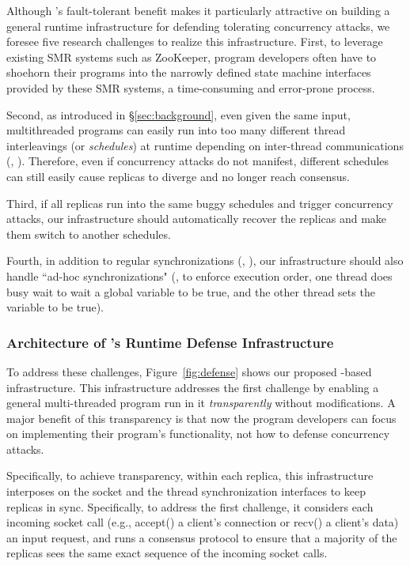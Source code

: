 Although \smr's fault-tolerant benefit makes it particularly attractive
on building a general runtime infrastructure for defending tolerating 
concurrency attacks, we foresee five research challenges to realize this 
infrastructure. First, to leverage existing SMR systems such as ZooKeeper, 
program developers often have to shoehorn their programs into the 
narrowly defined state machine interfaces provided by these SMR systems, a 
time-consuming and error-prone process.

Second, as introduced in \S\ref{sec:background}, even given the same 
input, multithreaded programs can easily run into too many different thread 
interleavings (or \emph{schedules}) at runtime depending on inter-thread 
communications (\eg, \mutexlock). Therefore, even if concurrency attacks do not 
manifest, different schedules can still easily cause replicas to diverge and no 
longer reach consensus. 


Third, if all replicas run into the same buggy schedules and trigger 
concurrency attacks, our infrastructure should automatically recover the 
replicas and make them switch to another schedules.

Fourth, in addition to regular synchronizations (\eg, \mutexlock), our 
infrastructure should also handle ``ad-hoc synchronizations" (\eg, to enforce 
execution order, one thread does busy wait to wait a global variable to be true, 
and the other thread sets the variable to be true).

\vspace{-.15in}\subsubsection{Architecture of \xxx's Runtime Defense 
Infrastructure} 
\label{sec:defense-arch}\vspace{-.075in}

To address these challenges, Figure~\ref{fig:defense} shows our proposed 
\smr-based infrastructure. This infrastructure addresses the first challenge by 
enabling a general multi-threaded program run in it \emph{transparently} 
without modifications. A major benefit of this transparency is that now the 
program developers can focus on implementing their program's functionality, not 
how to defense concurrency attacks.

Specifically, to achieve transparency, within each \smr replica, this 
infrastructure interposes on the socket and the thread synchronization 
interfaces to keep replicas in sync. Specifically, to address the first 
challenge, it considers each incoming socket call (e.g., accept() a client's 
connection or recv() a client's data) an input request, and runs a \paxos 
consensus protocol to ensure that a majority of the replicas sees the same 
exact sequence of the incoming socket calls.

